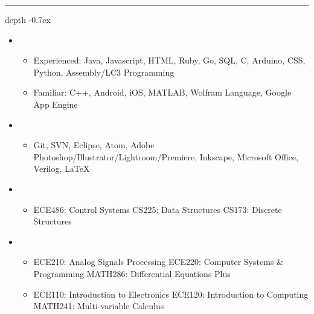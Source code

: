 \documentclass[10pt,letterpaper]{article}
\def\Vhrulefill{\leavevmode\leaders\hrule height 0.7ex depth \dimexpr0.4pt-0.7ex\hfill\kern0pt}
\begin{document}
%
%


\vspace{-.78mm}
\noindent \large{}  \Vhrulefill
\vspace{-.7mm}


\begin{itemize}[label={}]
 
 \item \small{}
 \vspace{-1.58mm}
 \begin{itemize}[label={}]
 	\item \small{Experienced: \hspace{3mm} Java, Javascript, HTML, Ruby, Go, SQL, C, Arduino, CSS, Python, Assembly/LC3 Programming}
 	\item \small{Familiar: \hspace{8mm} C++, Android, iOS, MATLAB, Wolfram Language, Google App Engine}
 \end{itemize}
 
  \item \small{}
 \vspace{-1.58mm}
 \begin{itemize}[label={}]
 	\item \small{Git, SVN, Eclipse, Atom, Adobe Photoshop/Illustrator/Lightroom/Premiere, Inkscape, Microsoft Office, Verilog, {\selectfont \LaTeX}}
 \end{itemize}
 
 \item \small{}
 \vspace{-1.58mm}
 \begin{itemize}[label={}]
 	\item \small{ECE486: Control Systems \hspace{3mm} CS225: Data Structures \hspace{3mm} CS173: Discrete Structures}
 \end{itemize}
 
 \item \small{}
 \vspace{-1.58mm}
 \begin{itemize}[label={}]
 	\item \small{ECE210: Analog Signals Processing \hspace{3mm} ECE220: Computer Systems & Programming \hspace{3mm} MATH286: Differential Equations Plus \hspace{3mm} }
 	\item \small{ECE110: Introduction to Electronics \hspace{2.7mm} ECE120: Introduction to Computing \hspace{11.7mm} MATH241: Multi-variable Calculus}
 \end{itemize}

\end{itemize}
\end{document}
